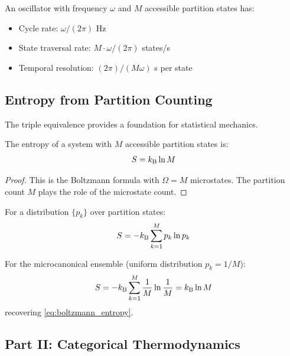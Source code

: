 An oscillator with frequency $\omega$ and $M$ accessible partition states has:
\begin{itemize}
    \item Cycle rate: $\omega/(2\pi)$ Hz
    \item State traversal rate: $M \cdot \omega/(2\pi)$ states/s
    \item Temporal resolution: $(2\pi)/(M\omega)$ s per state
\end{itemize}

\subsection{Entropy from Partition Counting}

The triple equivalence provides a foundation for statistical mechanics.

\begin{corollary}
The entropy of a system with $M$ accessible partition states is:
\begin{equation}
S = k_{\mathrm{B}} \ln M
\label{eq:boltzmann_entropy}
\end{equation}
\end{corollary}

\begin{proof}
This is the Boltzmann formula with $\Omega = M$ microstates. The partition count $M$ plays the role of the microstate count.
\end{proof}

\begin{corollary}
For a distribution $\{p_k\}$ over partition states:
\begin{equation}
S = -k_{\mathrm{B}} \sum_{k=1}^{M} p_k \ln p_k
\label{eq:gibbs_entropy}
\end{equation}
\end{corollary}

For the microcanonical ensemble (uniform distribution $p_k = 1/M$):
\begin{equation}
S = -k_{\mathrm{B}} \sum_{k=1}^{M} \frac{1}{M} \ln \frac{1}{M} = k_{\mathrm{B}} \ln M
\end{equation}
recovering \eqref{eq:boltzmann_entropy}.


\subsection*{Part II: Categorical Thermodynamics}

